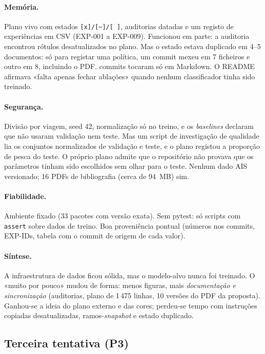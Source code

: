 \documentclass[11pt,a4paper]{article}
\newcommand{\Ptres}{\textbf{P3}}
\begin{document}
\paragraph{Memória.} Plano vivo com estados \texttt{[x]/[\textasciitilde]/[ ]}, auditorias
datadas e um registo de experiências em CSV (EXP-001 a EXP-009). Funcionou em parte: a auditoria
encontrou rótulos desatualizados no plano. Mas o estado estava duplicado em 4--5 documentos: só
para registar uma política, um commit mexeu em 7 ficheiros e outro em 8, incluindo o PDF.
\mDoisSoMd{} commits tocaram só em Markdown. O README afirmava «falta apenas fechar ablações»
quando nenhum classificador tinha sido treinado.

\paragraph{Segurança.} Divisão por viagem, seed 42, normalização só no treino, e os
\emph{baselines} declaram que não usaram validação nem teste. Mas um script de investigação de
qualidade lia os conjuntos normalizados de validação e teste, e o plano registou a proporção de
pesca do teste. O próprio plano admite que o repositório não provava que os parâmetros tinham sido
escolhidos sem olhar para o teste. Nenhum dado AIS versionado; 16 PDFs de bibliografia (cerca de
94~MB) sim.

\paragraph{Fiabilidade.} Ambiente fixado (33 pacotes com versão exata). Sem pytest: só
scripts com \texttt{assert} sobre dados de treino. Boa proveniência pontual (números nos commits,
EXP-IDs, tabela com o commit de origem de cada valor).

\paragraph{Síntese.} A infraestrutura de dados ficou sólida, mas o modelo-alvo nunca foi treinado. O «muito por pouco»
mudou de forma: menos figuras, mais \emph{documentação e sincronização} (auditorias, plano de
1\,475 linhas, 10 versões do PDF da proposta). Ganhou-se a ideia do plano externo e das cores;
perdeu-se tempo com instruções copiadas desatualizadas, ramos-\emph{snapshot} e estado
duplicado.

\subsection{Terceira tentativa (\Ptres)}
\end{document}
